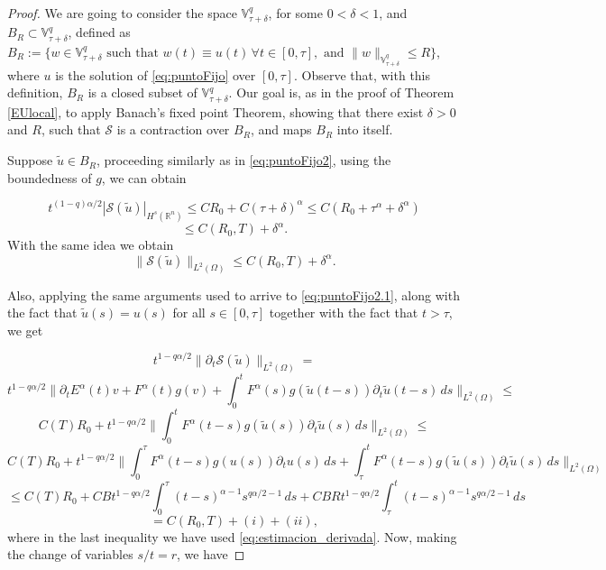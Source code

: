 \documentclass{amsart}
\newcommand{\rn}{{\mathbb{R}^n}}
\newcommand{\ele}{L^2(\Omega)}
\newcommand{\fmonio}{g}
\newcommand{\V}{\mathbb{V}^q}
\theoremstyle{remark}
\theoremstyle{definition}
\numberwithin{equation}{section}
\begin{document}
\begin{proof}
We are going to consider the space $\V_{\tau+\delta}$, for some $0 < \delta < 1$, and  $B_{R} \subset \V_{\tau+\delta}$, defined as $B_R := \{ w \in \V_{\tau+\delta} \text{ such that } w(t) \equiv u(t) \, \forall t \in [0,\tau], \text{ and } \|w\|_{\V_{\tau+\delta}} \leq R  \}$, where $u$ is the solution of \eqref{eq:puntoFijo} over $[0,\tau]$. Observe that, with this definition, $B_R$ is a closed subset of $\V_{\tau+\delta}$. Our goal is, as in the proof of Theorem \ref{EUlocal}, to apply Banach's fixed point Theorem, showing that there exist $\delta > 0$ and $R$, such that $\mathcal{S}$ is a contraction over $B_R$, and maps $B_R$ into itself. 

Suppose $\tilde{u} \in B_R$, proceeding similarly as in \eqref{eq:puntoFijo2}, using the boundedness of $\fmonio$, we can obtain

\begin{equation}
\label{eq:global1}
t^{(1-q)\alpha/2}|\mathcal{S}(\tilde{u})|_{H^s(\rn)} \leq CR_0 + C(\tau+\delta)^{\alpha} \leq C(R_0 + \tau^{\alpha}+\delta^{\alpha}) 
\end{equation}
$$ \leq C(R_0,T) + \delta^{\alpha}.$$
With the same idea we obtain 
\begin{equation}
\label{eq:global1bis}
\|\mathcal{S}(\tilde{u})\|_{\ele} \leq C(R_0,T) + \delta^{\alpha}.
\end{equation}

 
Also, applying the same arguments used to arrive to \eqref{eq:puntoFijo2.1}, along with the fact that $\tilde{u}(s) = u(s)$ for all $s \in [0,\tau]$ together with the fact that $t>\tau$, we get 

\begin{equation}
\label{eq:global2}
t^{1-q\alpha/2}\|\partial_t \mathcal{S}(\tilde{u})\|_{\ele} = 
\end{equation} 
$$
t^{1-q\alpha/2}\| \partial_t E^{\alpha}(t)v+ F^{\alpha}(t)\fmonio(v) + \int^{t}_{0} F^{\alpha}(s) \fmonio(\tilde{u}(t-s))\partial_t \tilde{u}(t-s)\,ds \|_{\ele} \leq 
$$
$$
C(T)R_0 + t^{1-q\alpha/2}\|\int^{t}_{0} F^{\alpha}(t-s) \fmonio(\tilde{u}(s))\partial_t \tilde{u}(s)\,ds\|_{\ele} \leq
$$
$$
C(T)R_0 + t^{1-q\alpha/2}\|\int^{\tau}_{0} F^{\alpha}(t-s) \fmonio(u(s))\partial_t u(s)\,ds + \int^{t}_{\tau} F^{\alpha}(t-s) \fmonio(\tilde{u}(s))\partial_t \tilde{u}(s)\,ds\|_{\ele}
$$
$$
\leq C(T)R_0 
+ CBt^{1-q\alpha/2}\int^{\tau}_{0} (t-s)^{\alpha-1} s^{q\alpha/2-1}\,ds 
+ CBRt^{1-q\alpha/2}\int^{t}_{\tau} (t-s)^{\alpha-1} s^{q\alpha/2-1}\,ds
$$
$$
 = C(R_0,T)  + (i) + (ii),
$$
where in the last inequality we have used \eqref{eq:estimacion_derivada}. Now, making the change of variables $s/t = r$, we have



\end{proof}
\end{document}
